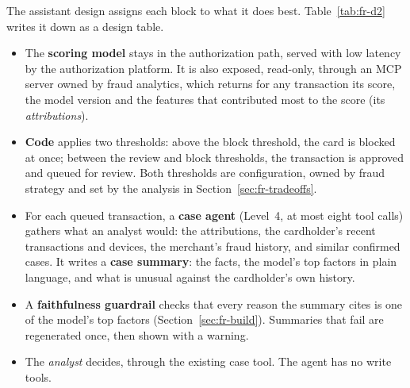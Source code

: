 The assistant design assigns each block to what it does best. Table~\ref{tab:fr-d2} writes it down as a design table.
\begin{itemize}[itemsep=1pt]
  \item The \textbf{scoring model} stays in the authorization path, served with low latency by the authorization platform. It is also exposed, read-only, through an MCP server owned by fraud analytics, which returns for any transaction its score, the model version and the features that contributed most to the score (its \emph{attributions}).
  \item \textbf{Code} applies two thresholds: above the block threshold, the card is blocked at once; between the review and block thresholds, the transaction is approved and queued for review. Both thresholds are configuration, owned by fraud strategy and set by the analysis in Section~\ref{sec:fr-tradeoffs}.
  \item For each queued transaction, a \textbf{case agent} (Level~4, at most eight tool calls) gathers what an analyst would: the attributions, the cardholder's recent transactions and devices, the merchant's fraud history, and similar confirmed cases. It writes a \textbf{case summary}: the facts, the model's top factors in plain language, and what is unusual against the cardholder's own history.
  \item A \textbf{faithfulness guardrail} checks that every reason the summary cites is one of the model's top factors (Section~\ref{sec:fr-build}). Summaries that fail are regenerated once, then shown with a warning.
  \item The \emph{analyst} decides, through the existing case tool. The agent has no write tools.
\end{itemize}

